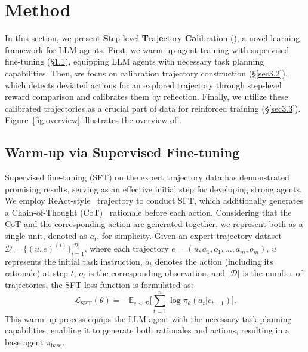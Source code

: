 \section{Method}

In this section, we present \textbf{S}tep-level \textbf{T}raj\textbf{e}ctory \textbf{Ca}libration (\textbf{\model}), a novel learning framework for LLM agents.
First, we warm up agent training with supervised fine-tuning (\S\ref{sec3.1}), equipping LLM agents with necessary task planning capabilities. 
Then, we focus on calibration trajectory construction (\S\ref{sec3.2}), which detects deviated actions for an explored trajectory through step-level reward comparison and calibrates them by reflection. 
Finally, we utilize these calibrated trajectories as a crucial part of data for reinforced training (\S\ref{sec3.3}).
Figure~\ref{fig:overview} illustrates the overview of \model.




\subsection{Warm-up via Supervised Fine-tuning}
\label{sec3.1}

Supervised fine-tuning (SFT) on the expert trajectory data has demonstrated promising results, serving as an effective initial step for developing strong agents. We employ ReAct-style~\cite{yao2023react} trajectory to conduct SFT, which additionally generates a Chain-of-Thought (CoT)~\cite{wei2022chain} rationale before each action. Considering that the CoT and the corresponding action are generated together, we represent both as a single unit, denoted as $a_t$, for simplicity.
Given an expert trajectory dataset $\mathcal D = \Big\{(u, e)^{(i)}\Big\}_{i=1}^{|\mathcal D|}$, where each trajectory $e = (u, a_1, o_1, ..., a_m, o_m)$, $u$ represents the initial task instruction, $a_t$ denotes the action (including its rationale) at step $t$, $o_t$ is the corresponding observation, and $|\mathcal D|$ is the number of trajectories, the SFT loss function is formulated as:
\begin{equation}
    \mathcal L_{\text{SFT}}(\theta) = -\mathbb E_{e \sim \mathcal D}\bigg[\sum_{t=1}^n \log \pi_\theta(a_t|e_{t-1})\bigg].
\end{equation}
This warm-up process equips the LLM agent with the necessary task-planning capabilities, enabling it to generate both rationales and actions, resulting in a base agent $\pi_{\text{base}}$.



